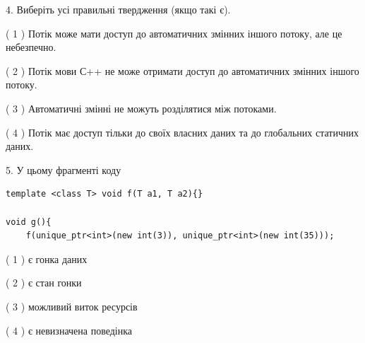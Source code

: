 \documentclass[12pt, ukrainian]{article}
\begin{document}
\begin {large}
{%
4. Виберіть усі правильні твердження (якщо такі є).\par
\vspace{2mm}

( 1 ) Потік може мати доступ до автоматичних змінних іншого потоку, але це небезпечно.%

( 2 ) Потік мови С++ не може отримати доступ до автоматичних змінних іншого потоку.%

( 3 ) Автоматичні змінні не можуть розділятися між потоками.%

( 4 ) Потік має доступ тільки до своїх власних даних та до глобальних статичних даних.%


5. У цьому фрагменті коду
\begin{verbatim}
template <class T> void f(T a1, T a2){}

void g(){
    f(unique_ptr<int>(new int(3)), unique_ptr<int>(new int(35)));
\end{verbatim}

( 1 ) є гонка даних%

( 2 ) є стан гонки%

( 3 ) можливий виток ресурсів%

( 4 ) є невизначена поведінка%
}
\end {large}
\end{document}
